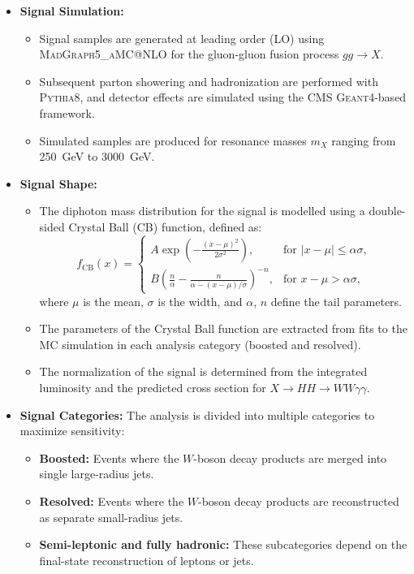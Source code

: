 \begin{itemize}
    \item \textbf{Signal Simulation:}
    \begin{itemize}
        \item Signal samples are generated at leading order (LO) using \textsc{MadGraph5\_aMC@NLO} for the gluon-gluon fusion process \(gg \to X\).
        \item Subsequent parton showering and hadronization are performed with \textsc{Pythia8}, and detector effects are simulated using the CMS \textsc{Geant4}-based framework.
        \item Simulated samples are produced for resonance masses \(m_X\) ranging from 250~GeV to 3000~GeV.
    \end{itemize}

    \item \textbf{Signal Shape:}
    \begin{itemize}
        \item The diphoton mass distribution for the signal is modelled using a double-sided Crystal Ball (CB) function, defined as:
        \[
        f_{\text{CB}}(x) =
        \begin{cases}
            A \exp\left(-\frac{(x-\mu)^2}{2\sigma^2}\right), & \text{for } |x-\mu| \leq \alpha\sigma, \\
            B \left(\frac{n}{\alpha} - \frac{n}{\alpha - (x-\mu)/\sigma} \right)^{-n}, & \text{for } x-\mu > \alpha\sigma,
        \end{cases}
        \]
        where \(\mu\) is the mean, \(\sigma\) is the width, and \(\alpha\), \(n\) define the tail parameters.
        \item The parameters of the Crystal Ball function are extracted from fits to the MC simulation in each analysis category (boosted and resolved).
        \item The normalization of the signal is determined from the integrated luminosity and the predicted cross section for \(X \to HH \to WW\gamma\gamma\).
    \end{itemize}

    \item \textbf{Signal Categories:}
    The analysis is divided into multiple categories to maximize sensitivity:
    \begin{itemize}
        \item \textbf{Boosted:} Events where the \(W\)-boson decay products are merged into single large-radius jets.
        \item \textbf{Resolved:} Events where the \(W\)-boson decay products are reconstructed as separate small-radius jets.
        \item \textbf{Semi-leptonic and fully hadronic:} These subcategories depend on the final-state reconstruction of leptons or jets.
    \end{itemize}
\end{itemize}

